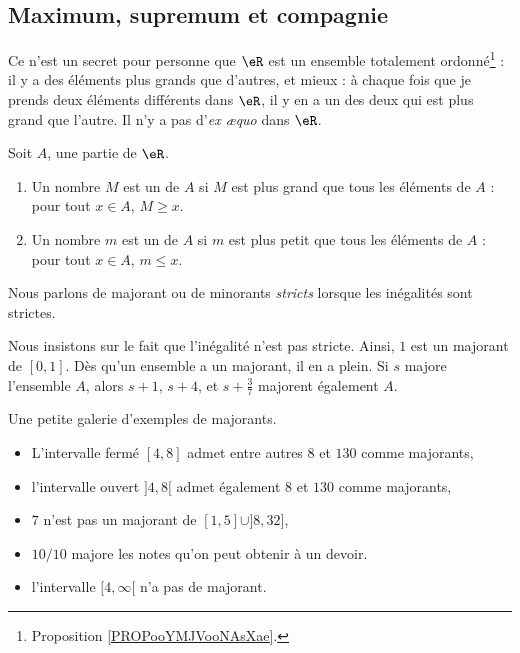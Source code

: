 \subsection{Maximum, supremum et compagnie}

Ce n'est un secret pour personne que $\eR$ est un ensemble totalement ordonné\footnote{Proposition \ref{PROPooYMJVooNAsXae}.} : il y a des éléments plus grands que d'autres, et mieux : à chaque fois que je prends deux éléments différents dans $\eR$, il y en a un des deux qui est plus grand que l'autre. Il n'y a pas d'\emph{ex æquo} dans $\eR$.

\begin{definition}
	Soit \( A\), une partie de \( \eR\).
	\begin{enumerate}
		\item
		      Un nombre \( M\) est un  de \( A\) si \( M\) est plus grand que tous les éléments de \( A\) : pour tout \( x\in A\), \( M\geq x\).
		\item
		      Un nombre \( m\) est un  de \( A\) si \( m\) est plus petit que tous les éléments de \( A\) : pour tout \( x\in A\), \( m\leq x\).
	\end{enumerate}
	Nous parlons de majorant ou de minorants \emph{stricts} lorsque les inégalités sont strictes.
\end{definition}

Nous insistons sur le fait que l'inégalité n'est pas stricte. Ainsi, $1$ est un majorant de $[0,1]$. Dès qu'un ensemble a un majorant, il en a plein. Si $s$ majore l'ensemble $A$, alors $s+1$, $s+4$, et \( s+\frac{ 3 }{ 7 }\) majorent également $A$.

\begin{example}
	Une petite galerie d'exemples de majorants.
	\begin{itemize}
		\item L'intervalle fermé $[4,8]$ admet entre autres $8$ et $130$ comme majorants,
		\item l'intervalle ouvert $]4,8[$ admet également $8$ et $130$ comme majorants,
		\item $7$ n'est pas un majorant de $[1,5]\cup]8,32]$,
		\item $10/10$ majore les notes qu'on peut obtenir à un devoir.
		\item l'intervalle $[4,\infty[$ n'a pas de majorant.
	\end{itemize}
\end{example}

